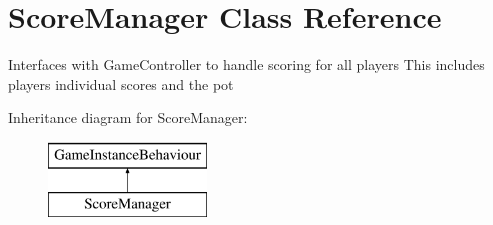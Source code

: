 \hypertarget{class_score_manager}{}\section{Score\+Manager Class Reference}
\label{class_score_manager}


Interfaces with Game\+Controller to handle scoring for all players This includes players\textquotesingle{} individual scores and the pot  


Inheritance diagram for Score\+Manager\+:\begin{figure}[H]
\begin{center}
\leavevmode
\includegraphics[height=2.000000cm]{class_score_manager}
\end{center}
\end{figure}
